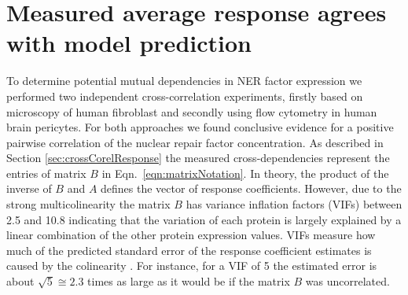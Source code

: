 \section{Measured average response agrees with model prediction}
To determine potential mutual dependencies in NER factor expression we performed two independent cross-correlation experiments, firstly based on microscopy of human fibroblast and secondly using flow cytometry in human brain pericytes. For both approaches we found conclusive evidence for a positive pairwise correlation of the nuclear repair factor concentration. As described in Section \ref{sec:crossCorelResponse} the measured cross-dependencies represent the entries of matrix $B$ in Eqn.\ \ref{eqn:matrixNotation}. In theory, the product of the inverse of $B$ and $A$ defines the vector of response coefficients. However, due to the strong multicolinearity the matrix $B$ has variance inflation factors (VIFs)\label{sec:vif} between 2.5 and 10.8 indicating that the variation of each protein is largely explained by a linear combination of the other protein expression values. VIFs measure how much of the predicted standard error of the response coefficient estimates is caused by the colinearity \cite{allison1999multiple}. For instance, for a VIF of 5 the estimated error is  about $\sqrt{5} \cong 2.3$ times as large as it would be if the matrix $B$ was uncorrelated. 
